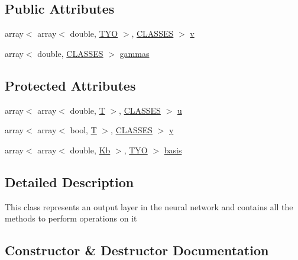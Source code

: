 \subsection*{Public Attributes}
\begin{DoxyCompactItemize}
\item 
array$<$ array$<$ double, \mbox{\hyperlink{_constants_8h_ade2b686fe2ed5231b32fced73d812981}{T\+YO}} $>$, \mbox{\hyperlink{_constants_8h_a12148c0e36153a905f4f6ef1afdbb27e}{C\+L\+A\+S\+S\+ES}} $>$ \mbox{\hyperlink{class_output_layer_a1e0b9c3531cfb70a628330287f2f0f51}{v}}
\item 
array$<$ double, \mbox{\hyperlink{_constants_8h_a12148c0e36153a905f4f6ef1afdbb27e}{C\+L\+A\+S\+S\+ES}} $>$ \mbox{\hyperlink{class_output_layer_a7622e6982f5031e6facde898b65e8e88}{gammas}}
\end{DoxyCompactItemize}
\subsection*{Protected Attributes}
\begin{DoxyCompactItemize}
\item 
array$<$ array$<$ double, \mbox{\hyperlink{_constants_8h_a6108cec236ef7a2e1d3259931de87186}{T}} $>$, \mbox{\hyperlink{_constants_8h_a12148c0e36153a905f4f6ef1afdbb27e}{C\+L\+A\+S\+S\+ES}} $>$ \mbox{\hyperlink{class_output_layer_abce2a9dfa14ad6014f34ca523a24a09b}{u}}
\item 
array$<$ array$<$ bool, \mbox{\hyperlink{_constants_8h_a6108cec236ef7a2e1d3259931de87186}{T}} $>$, \mbox{\hyperlink{_constants_8h_a12148c0e36153a905f4f6ef1afdbb27e}{C\+L\+A\+S\+S\+ES}} $>$ \mbox{\hyperlink{class_output_layer_a879082b1b83f40d8c0af479a814f931c}{y}}
\item 
array$<$ array$<$ double, \mbox{\hyperlink{_constants_8h_ad3e444d768e5365a1620b7b5702c4eb8}{Kb}} $>$, \mbox{\hyperlink{_constants_8h_ade2b686fe2ed5231b32fced73d812981}{T\+YO}} $>$ \mbox{\hyperlink{class_output_layer_af1e4ba231ebb2ceb46a6349d4ee57f9c}{basis}}
\end{DoxyCompactItemize}


\subsection{Detailed Description}
This class represents an output layer in the neural network and contains all the methods to perform operations on it 

\subsection{Constructor \& Destructor Documentation}
\mbox{\label{class_output_layer_a65757bdb7320aa070ba901ea36a46663}} 
